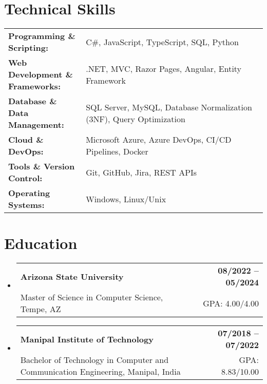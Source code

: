 \documentclass[letterpaper,11pt]{article}
\makeatletter
\newcommand{\educationSubheading}[4]{
  \vspace{-2pt}\item
    \begin{tabular*}{1.0\textwidth}[t]{l@{\extracolsep{\fill}}r}
      \textbf{\small #1} & \textbf{\small #2} \\
      {\small#3} & {\small #4} \\
    \end{tabular*}\vspace{-7pt}
}
\newcommand{\resumeSubHeadingListStart}{\begin{itemize}[leftmargin=0pt, label={}]}
\newcommand{\resumeSubHeadingListEnd}{\end{itemize}}
\makeatother
\begin{document}
\section{Technical Skills}
        \vspace{-14pt}
        \begin{table}[h]
            \footnotesize
            \begin{tabular}{p{0.3\linewidth} p{0.7\linewidth}}
                \textbf{Programming \& Scripting:} & C\#, JavaScript, TypeScript, SQL, Python \\
                \textbf{Web Development \& Frameworks:} & .NET, MVC, Razor Pages, Angular, Entity Framework \\
                \textbf{Database \& Data Management:} & SQL Server, MySQL, Database Normalization (3NF), Query Optimization \\
                \textbf{Cloud \& DevOps:} & Microsoft Azure, Azure DevOps, CI/CD Pipelines, Docker \\
                \textbf{Tools \& Version Control:} & Git, GitHub, Jira, REST APIs \\
                \textbf{Operating Systems:} & Windows, Linux/Unix \\
            \end{tabular}
        \end{table}

 \vspace{-15pt}

\section{Education}
  \resumeSubHeadingListStart
    \educationSubheading
      {Arizona State University}{08/2022 -- 05/2024}
      {Master of Science in Computer Science, Tempe, AZ}{GPA: 4.00/4.00}

    \educationSubheading
      {Manipal Institute of Technology}{07/2018 -- 07/2022}
      {Bachelor of Technology in Computer and Communication Engineering, Manipal, India}{GPA: 8.83/10.00}
  \resumeSubHeadingListEnd
\end{document}
